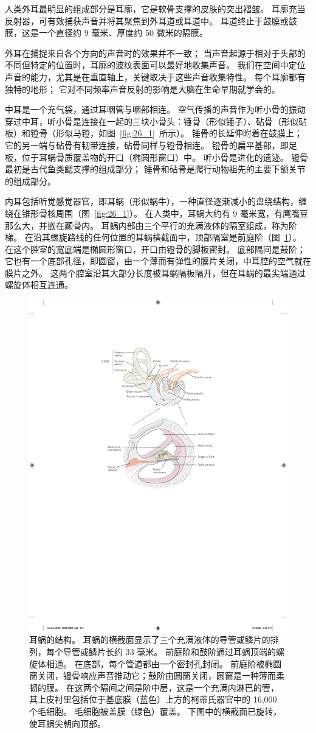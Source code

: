 人类外耳最明显的组成部分是耳廓，它是软骨支撑的皮肤的突出褶皱。
耳廓充当反射器，可有效捕获声音并将其聚焦到外耳道或耳道中。
耳道终止于鼓膜或鼓膜，这是一个直径约 9 毫米、厚度约 50 微米的隔膜。


外耳在捕捉来自各个方向的声音时的效果并不一致；
当声音起源于相对于头部的不同但特定的位置时，耳廓的波纹表面可以最好地收集声音。
我们在空间中定位声音的能力，尤其是在垂直轴上，关键取决于这些声音收集特性。
每个耳廓都有独特的地形；
它对不同频率声音反射的影响是大脑在生命早期就学会的。


中耳是一个充气袋，通过耳咽管与咽部相连。
空气传播的声音作为听小骨的振动穿过中耳，听小骨是连接在一起的三块小骨头：锤骨（形似锤子）、砧骨（形似砧板）和镫骨（形似马镫，如图~\ref{fig:26_1}~所示）。
锤骨的长延伸附着在鼓膜上；
它的另一端与砧骨有韧带连接，砧骨同样与镫骨相连。
镫骨的扁平基部，即足板，位于耳蜗骨质覆盖物的开口（椭圆形窗口）中。
听小骨是进化的遗迹。
镫骨最初是古代鱼类鳃支撑的组成部分；
锤骨和砧骨是爬行动物祖先的主要下颌关节的组成部分。


内耳包括听觉感觉器官，即耳蜗（形似蜗牛），一种直径逐渐减小的盘绕结构，缠绕在锥形骨核周围（图~\ref{fig:26_1}）。
在人类中，耳蜗大约有 9 毫米宽，有鹰嘴豆那么大，并嵌在颞骨内。
耳蜗内部由三个平行的充满液体的隔室组成，称为阶梯。
在沿其螺旋路线的任何位置的耳蜗横截面中，顶部隔室是前庭阶（图~\ref{fig:26_2}）。
在这个腔室的宽底端是椭圆形窗口，开口由镫骨的脚板密封。
底部隔间是鼓阶；
它也有一个底部孔径，即圆窗，由一个薄而有弹性的膜片关闭，中耳腔的空气就在膜片之外。
这两个腔室沿其大部分长度被耳蜗隔板隔开，但在耳蜗的最尖端通过螺旋体相互连通。


\begin{figure}[htbp]
	\centering
	\includegraphics[width=0.5\linewidth]{chap26/fig_26_2}
	\caption{耳蜗的结构。 
		耳蜗的横截面显示了三个充满液体的导管或鳞片的排列，每个导管或鳞片长约 33 毫米。
		前庭阶和鼓阶通过耳蜗顶端的螺旋体相通。
		在底部，每个管道都由一个密封孔封闭。
		前庭阶被椭圆窗关闭，镫骨响应声音推动它；鼓阶由圆窗关闭，圆窗是一种薄而柔韧的膜。
		在这两个隔间之间是阶中层，这是一个充满内淋巴的管，其上皮衬里包括位于基底膜（蓝色）上方的柯蒂氏器官中的 16,000 个毛细胞。
		毛细胞被盖膜（绿色）覆盖。
		下图中的横截面已旋转，使耳蜗尖朝向顶部。}
	\label{fig:26_2}
\end{figure}


